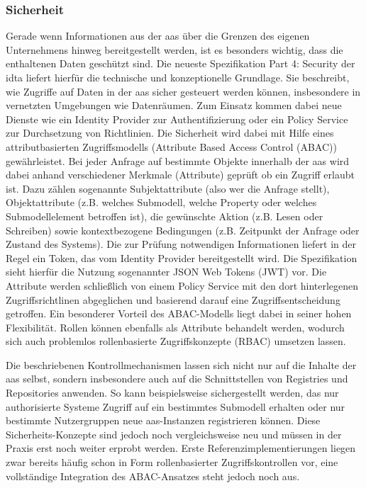 \subsubsection{Sicherheit}
Gerade wenn Informationen aus der \acs{aas} über die Grenzen des eigenen Unternehmens hinweg bereitgestellt werden, ist es besonders wichtig, dass die enthaltenen Daten geschützt sind. 
Die neueste Spezifikation Part 4: Security \cite{SpezifikationPart4} der \acs{idta} liefert hierfür die technische und konzeptionelle Grundlage.
Sie  beschreibt, wie Zugriffe auf Daten in der \acs{aas} sicher gesteuert werden können, insbesondere in vernetzten Umgebungen wie Datenräumen.
Zum Einsatz kommen dabei neue Dienste wie ein Identity Provider zur Authentifizierung oder ein Policy Service zur Durchsetzung von Richtlinien.
Die Sicherheit wird dabei mit Hilfe eines attributbasierten Zugriffsmodells (Attribute Based Access Control (ABAC)) gewährleistet.
Bei jeder Anfrage auf bestimmte Objekte innerhalb der \acs{aas} wird dabei anhand verschiedener Merkmale (Attribute) geprüft ob ein Zugriff erlaubt ist.
Dazu zählen sogenannte Subjektattribute (also wer die Anfrage stellt), Objektattribute (z.B. welches Submodell, welche Property oder welches Submodellelement betroffen ist), die gewünschte Aktion (z.B. Lesen oder Schreiben) sowie kontextbezogene Bedingungen (z.B. Zeitpunkt der Anfrage oder Zustand des Systems).
Die zur Prüfung notwendigen Informationen liefert in der Regel ein Token, das vom Identity Provider bereitgestellt wird. Die Spezifikation sieht hierfür die Nutzung sogenannter JSON Web Tokens (JWT) vor.
Die Attribute werden schließlich von einem Policy Service mit den dort hinterlegenen Zugriffsrichtlinen abgeglichen und basierend darauf eine Zugriffsentscheidung getroffen.
Ein besonderer Vorteil des ABAC-Modells liegt dabei in seiner hohen Flexibilität. Rollen können ebenfalls als Attribute behandelt werden, wodurch sich auch problemlos rollenbasierte Zugriffskonzepte (RBAC) umsetzen lassen. 

Die beschriebenen Kontrollmechanismen lassen sich nicht nur auf die Inhalte der \acs{aas} selbst, sondern insbesondere auch auf die Schnittstellen von Registries und Repositories anwenden.
So kann beispielsweise sichergestellt werden, das nur authorisierte Systeme Zugriff auf ein bestimmtes Submodell erhalten oder nur bestimmte Nutzergruppen neue \acs{aas}-Instanzen registrieren können.
Diese Sicherheits-Konzepte sind jedoch noch vergleichsweise neu und müssen in der Praxis erst noch weiter erprobt werden.
Erste Referenzimplementierungen liegen zwar bereits häufig schon in Form rollenbasierter Zugriffskontrollen vor, eine vollständige Integration des ABAC-Ansatzes steht jedoch noch aus.


